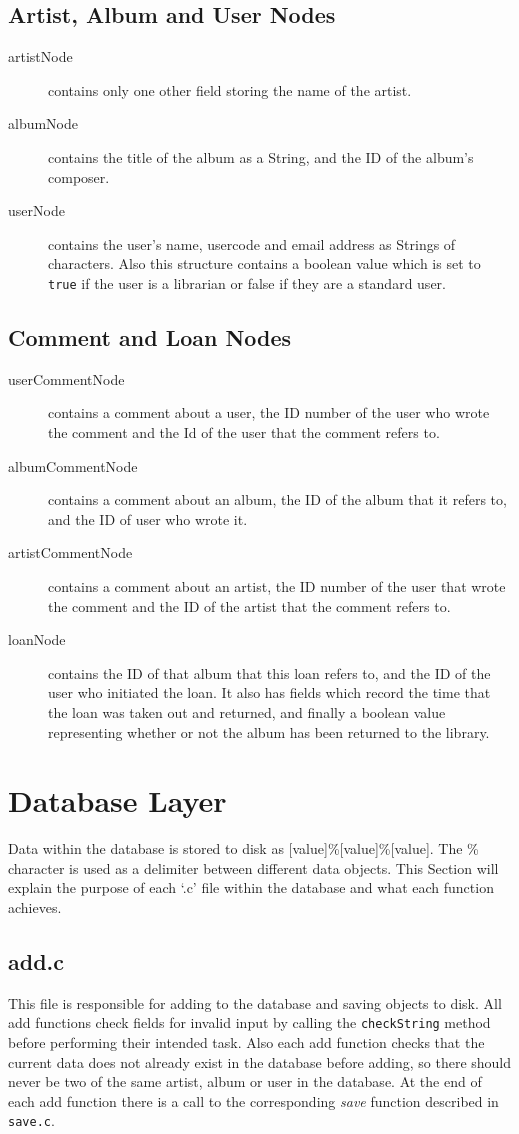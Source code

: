 \documentclass{article}
\begin{document}
\subsection{Artist, Album and User Nodes}
\begin{description}
\item[artistNode]  contains only one other field storing the name of the artist.
\item[albumNode] contains the title of the album as a String, and the ID of the album's composer.
\item[userNode] contains the user's name, usercode and email address as Strings of characters. Also this structure contains a boolean value which is set to \verb|true| if the user is a librarian or false if they are a standard user.
\end{description}
\subsection{Comment and Loan Nodes}
\begin{description}
\item[userCommentNode] contains a comment about a user, the ID number of the user who wrote the comment and the Id of the user that the comment refers to.
\item[albumCommentNode] contains a comment about an album, the ID of the album that it refers to, and the ID of user who wrote it.
\item[artistCommentNode] contains a comment about an artist, the ID number of the user that wrote the comment and the ID of the artist that the comment refers to.
\item[loanNode] contains the ID of that album that this loan refers to, and the ID of the user who initiated the loan. It also has fields which record the time that the loan was taken out and returned, and finally a boolean value representing whether or not the album has been returned to the library.
\end{description}


\section{Database Layer}
Data within the database is stored to disk as [value]\%[value]\%[value]. The \% character is used as a delimiter between different data objects. This Section will explain the purpose of each `.c' file within the database and what each function achieves.
\subsection{add.c}
This file is responsible for adding to the database and saving objects to disk. All add functions check fields for invalid input by calling the \verb|checkString| method before performing their intended task. Also each add function checks that the current data does not already exist in the database before adding, so there should never be two of the same artist, album or user in the database. At the end of each add function there is a call to the corresponding \emph{save} function described in \verb|save.c|.
\end{document}

